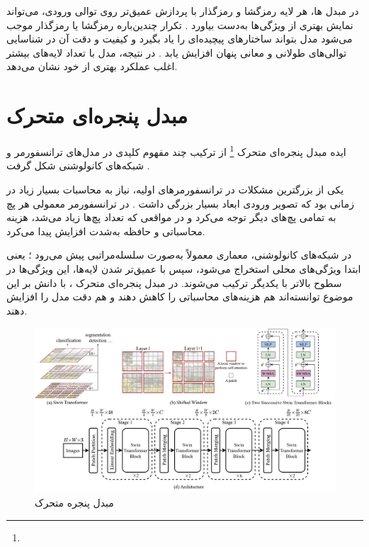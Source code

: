 در مبدل ها، هر لایه رمزگشا و رمزگذار با پردازش عمیق‌تر روی توالی ورودی، می‌تواند نمایش بهتری از ویژگی‌ها به‌دست بیاورد \cite{vaswani2017attention}. تکرار چندین‌باره رمزگشا یا رمزگذار موجب می‌شود مدل بتواند ساختارهای پیچیده‌ای را یاد بگیرد و کیفیت و دقت آن در شناسایی توالی‌های طولانی و معانی پنهان افزایش یابد \cite{vaswani2017attention,dosovitskiy2020image}. 
در نتیجه، مدل با تعداد لایه‌های بیشتر اغلب عملکرد بهتری از خود نشان می‌دهد.

   
   
\section{مبدل پنجره‌ای متحرک}
ایده مبدل پنجره‌ای متحرک \footnote{} از ترکیب چند مفهوم کلیدی در مدل‌های ترانسفورمر و شبکه‌های کانولوشنی شکل گرفت \cite{vaswani2017attention,he2016deep,liu2021swintransformer}.

یکی از بزرگترین مشکلات در ترانسفورمرهای اولیه، نیاز به محاسبات بسیار زیاد در زمانی بود که تصویر ورودی ابعاد بسیار بزرگی داشت \cite{dosovitskiy2020image}. در ترانسفورمر معمولی هر پچ به تمامی پچ‌های دیگر توجه  می‌کرد و در مواقعی که تعداد پچ‌ها زیاد می‌شد، هزینه محاسباتی و حافظه به‌شدت افزایش پیدا می‌کرد.

در شبکه‌های کانولوشنی، معماری معمولاً به‌صورت سلسله‌مراتبی پیش می‌رود \cite{he2016deep}؛ یعنی ابتدا ویژگی‌های محلی استخراج می‌شود، سپس با عمیق‌تر شدن لایه‌ها، این ویژگی‌ها در سطوح بالاتر با یکدیگر ترکیب می‌شوند. در مبدل پنجره‌ای متحرک \cite{liu2021swintransformer}، با دانش بر این موضوع توانسته‌اند هم هزینه‌های محاسباتی را کاهش دهند و هم دقت مدل را افزایش دهند.

\begin{figure}[h]
	\centering
	\begin{minipage}[b]{1\textwidth}
		\centering
		\includegraphics[width=\textwidth]{transformer_images/swin_transformer.png}
		\caption{مبدل پنجره متحرک}
		\label{fig: swin transformer}
	\end{minipage}
	\hfill
\end{figure}

